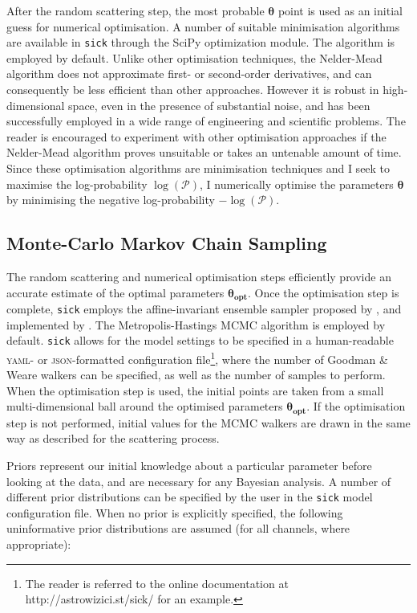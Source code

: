 \documentclass[iop]{emulateapj}
\newcommand{\sick}{\texttt{sick}}
\begin{document}
After the random scattering step, the most probable $\bm{\theta}$ point is used 
as an initial guess for numerical optimisation. A number of suitable minimisation 
algorithms are available in \sick{} through the SciPy \citep{scipy} optimization 
module. The \citet{nelder-mead} algorithm is employed by default.
Unlike other optimisation techniques, the Nelder-Mead algorithm 
does not approximate first- or second-order derivatives, and can consequently be 
less efficient than other approaches. However it is robust in high-dimensional 
space, even in the presence of substantial noise, and has been successfully 
employed in a wide range of engineering and scientific problems. The reader is 
encouraged to experiment with other optimisation approaches if the Nelder-Mead 
algorithm proves unsuitable or takes an untenable amount of time. Since these 
optimisation algorithms are minimisation techniques and I seek to maximise the 
log-probability $\log{\left(\mathcal{P}\right)}$, I numerically optimise the 
parameters $\bm{\theta}$ by minimising the negative log-probability 
$-\log{\left(\mathcal{P}\right)}$.

\subsection{Monte-Carlo Markov Chain Sampling}
\label{sec:mcmc}

The random scattering and numerical optimisation steps efficiently provide an 
accurate estimate of the optimal parameters $\bm{\theta_{opt}}$. Once the optimisation
 step is complete, \sick{} employs the affine-invariant ensemble sampler proposed 
 by \citet{goodman;weare}, and implemented by \citet{emcee}. The Metropolis-Hastings 
 MCMC algorithm is employed by default. \sick{} allows for the model settings to 
 be specified in a human-readable \textsc{yaml}- or \textsc{json}-formatted 
 configuration file\footnote{The reader is referred to the online documentation at http://astrowizici.st/sick/ 
 for an example.}, where the number of Goodman \& Weare walkers can be specified, 
 as well as the number of samples to perform. When the optimisation step is used, 
 the initial points are taken from a small multi-dimensional ball around the 
 optimised parameters $\bm{\theta_{opt}}$. If the optimisation step is not 
 performed, initial values for the MCMC walkers are drawn in the same way as 
 described for the scattering process. 

Priors represent our initial knowledge about a particular parameter before 
looking at the data, and are necessary for any Bayesian analysis. A number of 
different prior distributions can be specified by the user in the \sick{} model 
configuration file. When no prior is explicitly specified, the following 
uninformative prior distributions are assumed (for all channels, where appropriate):
\end{document}
